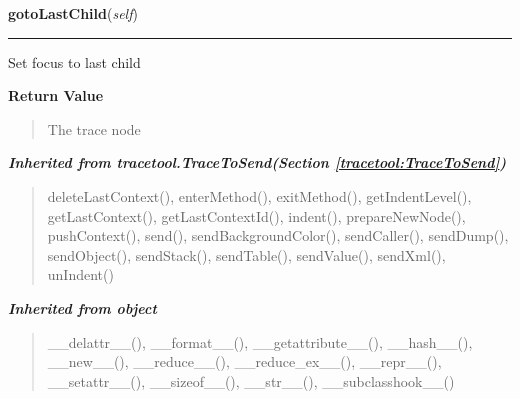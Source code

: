     \label{tracetool:TraceNode:gotoLastChild}

    \vspace{0.5ex}

\hspace{.8\funcindent}\begin{boxedminipage}{\funcwidth}

    \raggedright \textbf{gotoLastChild}(\textit{self})

    \vspace{-1.5ex}

    \rule{\textwidth}{0.5\fboxrule}
\setlength{\parskip}{2ex}
    Set focus to last child

\setlength{\parskip}{1ex}
      \textbf{Return Value}
    \vspace{-1ex}

      \begin{quote}
      The trace node

      \end{quote}

    \end{boxedminipage}


\large{\textbf{\textit{Inherited from tracetool.TraceToSend\textit{(Section \ref{tracetool:TraceToSend})}}}}

\begin{quote}
deleteLastContext(), enterMethod(), exitMethod(), getIndentLevel(), getLastContext(), getLastContextId(), indent(), prepareNewNode(), pushContext(), send(), sendBackgroundColor(), sendCaller(), sendDump(), sendObject(), sendStack(), sendTable(), sendValue(), sendXml(), unIndent()
\end{quote}

\large{\textbf{\textit{Inherited from object}}}

\begin{quote}
\_\_delattr\_\_(), \_\_format\_\_(), \_\_getattribute\_\_(), \_\_hash\_\_(), \_\_new\_\_(), \_\_reduce\_\_(), \_\_reduce\_ex\_\_(), \_\_repr\_\_(), \_\_setattr\_\_(), \_\_sizeof\_\_(), \_\_str\_\_(), \_\_subclasshook\_\_()
\end{quote}


